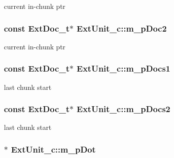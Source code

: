 current in-\/chunk ptr 

\hypertarget{classExtUnit__c_a6ac3e6d0fea9e516b82b16af493a92ee}{
\subsubsection[{m\-\_\-p\-Doc2}]{\setlength{\rightskip}{0pt plus 5cm}const {\bf Ext\-Doc\-\_\-t}$\ast$ Ext\-Unit\-\_\-c\-::m\-\_\-p\-Doc2\hspace{0.3cm}{\ttfamily [private]}}}\label{classExtUnit__c_a6ac3e6d0fea9e516b82b16af493a92ee}


current in-\/chunk ptr 

\hypertarget{classExtUnit__c_a1822c52205d27529018c54c55aee9012}{
\subsubsection[{m\-\_\-p\-Docs1}]{\setlength{\rightskip}{0pt plus 5cm}const {\bf Ext\-Doc\-\_\-t}$\ast$ Ext\-Unit\-\_\-c\-::m\-\_\-p\-Docs1\hspace{0.3cm}{\ttfamily [private]}}}\label{classExtUnit__c_a1822c52205d27529018c54c55aee9012}


last chunk start 

\hypertarget{classExtUnit__c_a6fdbefe3c3cda0230675f702ded7c418}{
\subsubsection[{m\-\_\-p\-Docs2}]{\setlength{\rightskip}{0pt plus 5cm}const {\bf Ext\-Doc\-\_\-t}$\ast$ Ext\-Unit\-\_\-c\-::m\-\_\-p\-Docs2\hspace{0.3cm}{\ttfamily [private]}}}\label{classExtUnit__c_a6fdbefe3c3cda0230675f702ded7c418}


last chunk start 

\hypertarget{classExtUnit__c_a48f8a3ee256cd29b1683f39e20af702d}{
\subsubsection[{m\-\_\-p\-Dot}]{$\ast$ Ext\-Unit\-\_\-c\-::m\-\_\-p\-Dot\hspace{0.3cm}{\ttfamily [private]}}}\label{classExtUnit__c_a48f8a3ee256cd29b1683f39e20af702d}


